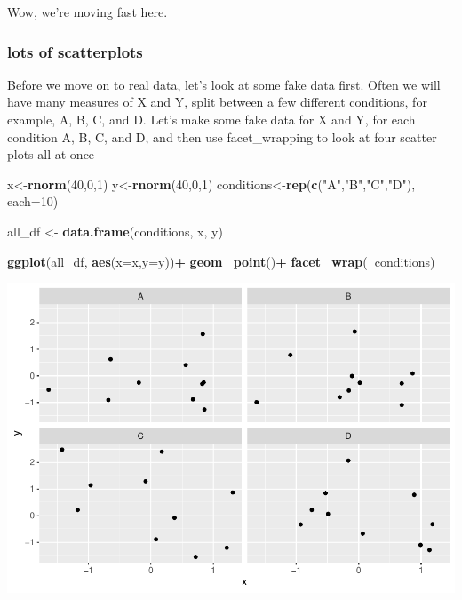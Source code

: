 \documentclass[]{book}
\newenvironment{Shaded}{\begin{snugshade}}{\end{snugshade}}
\newcommand{\KeywordTok}[1]{\textcolor[rgb]{0.13,0.29,0.53}{\textbf{#1}}}
\newcommand{\DataTypeTok}[1]{\textcolor[rgb]{0.13,0.29,0.53}{#1}}
\newcommand{\DecValTok}[1]{\textcolor[rgb]{0.00,0.00,0.81}{#1}}
\newcommand{\StringTok}[1]{\textcolor[rgb]{0.31,0.60,0.02}{#1}}
\newcommand{\OperatorTok}[1]{\textcolor[rgb]{0.81,0.36,0.00}{\textbf{#1}}}
\newcommand{\NormalTok}[1]{#1}
\begin{document}
Wow, we're moving fast here.

\subsubsection{lots of scatterplots}\label{lots-of-scatterplots}

Before we move on to real data, let's look at some fake data first.
Often we will have many measures of X and Y, split between a few
different conditions, for example, A, B, C, and D. Let's make some fake
data for X and Y, for each condition A, B, C, and D, and then use
facet\_wrapping to look at four scatter plots all at once

\begin{Shaded}
\begin{Highlighting}[]
\NormalTok{x<-}\KeywordTok{rnorm}\NormalTok{(}\DecValTok{40}\NormalTok{,}\DecValTok{0}\NormalTok{,}\DecValTok{1}\NormalTok{)}
\NormalTok{y<-}\KeywordTok{rnorm}\NormalTok{(}\DecValTok{40}\NormalTok{,}\DecValTok{0}\NormalTok{,}\DecValTok{1}\NormalTok{)}
\NormalTok{conditions<-}\KeywordTok{rep}\NormalTok{(}\KeywordTok{c}\NormalTok{(}\StringTok{"A"}\NormalTok{,}\StringTok{"B"}\NormalTok{,}\StringTok{"C"}\NormalTok{,}\StringTok{"D"}\NormalTok{), }\DataTypeTok{each=}\DecValTok{10}\NormalTok{)}

\NormalTok{all_df <-}\StringTok{ }\KeywordTok{data.frame}\NormalTok{(conditions, x, y)}

\KeywordTok{ggplot}\NormalTok{(all_df, }\KeywordTok{aes}\NormalTok{(}\DataTypeTok{x=}\NormalTok{x,}\DataTypeTok{y=}\NormalTok{y))}\OperatorTok{+}
\StringTok{  }\KeywordTok{geom_point}\NormalTok{()}\OperatorTok{+}
\StringTok{  }\KeywordTok{facet_wrap}\NormalTok{(}\OperatorTok{~}\NormalTok{conditions)}
\end{Highlighting}
\end{Shaded}

\includegraphics{Statistics_Lab_files/figure-latex/unnamed-chunk-67-1.pdf}
\end{document}
